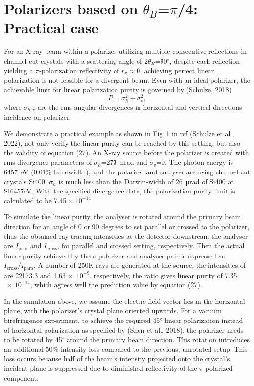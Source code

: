\documentclass{iucr}
\begin{document}
\section{Polarizers based on $\theta_B$=$\pi$/4: Practical case}\label{sec:polarizers45degPractical}

For an X-ray beam within a polarizer utilizing multiple consecutive reflections in channel-cut crystals with a scattering angle of $2\theta_B$=90$^\circ$, despite each reflection yielding a $\pi$-polarization reflectivity of $r_\pi\approx 0$, achieving perfect linear polarization is not feasible for a divergent beam.
Even with an ideal polarizer, the achievable limit for linear polarization purity is governed by (Schulze, 2018)
\begin{equation}\label{eq:polarizer}
    P = \sigma_h^2 + \sigma_v^2,
\end{equation}
where $\sigma_{h,v}$ are the rms angular divergences in horizontal and vertical directions incidence on polarizer.

We demonstrate a practical example as shown in Fig~1 in ref (Schulze et al., 2022), not only verify the linear purity can be reached by this setting, but also the validity of equation (27).
An X-ray source before the polarizer is created with rms divergence parameters of $\sigma_h$=273~nrad and $\sigma_v$=0.
The photon energy is \SI{6457}{eV} (0.01\% bandwidth), and the polarizer and analyser are using channel cut crystals Si400.
$\sigma_h$ is much less than the Darwin-width of \SI{26}{\micro\radian} of Si400 at SI{6457}{eV}.
With the specified divergence data, the polarization purity limit is calculated to be 7.45 $\times~10^{-14}$.

To simulate the linear purity, the analyser is rotated around the primary beam direction for an angle of 0 or 90 degrees to set parallel or crossed to the polarizer, thus the obtained ray-tracing intensities at the detector downstream the analyser are $I_\text{para}$ and $I_\text{cross}$, for parallel and crossed setting, respectively.
Then the actual linear purity achieved by these polarizer and analyser pair is expressed as $I_\text{cross}/I_\text{para}$.
A number of 250K rays are generated at the source, the intensities of  are 22173.3 and 1.63$~\times~10^{-9}$, respectively, the ratio gives linear purity of 7.35$~\times~10^{-14}$, which agrees well the prediction value by equation (27).

In the simulation above, we assume the electric field vector lies in the horizontal plane, with the polarizer’s crystal plane oriented upwards.
For a vacuum birefringence experiment, to achieve the required 45° linear polarization instead of horizontal polarization as specified by (Shen et al., 2018), the polarizer needs to be rotated by 45$^\circ$ around the primary beam direction.
This rotation introduces an additional 50\% intensity loss compared to the previous, unrotated setup.
This loss occurs because half of the beam’s intensity projected onto the crystal’s incident plane is suppressed due to diminished reflectivity of the $\pi$-polarized component.
\end{document}

